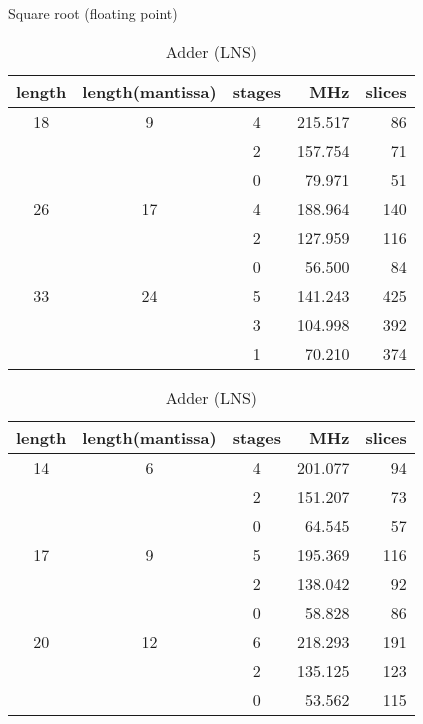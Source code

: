 \documentclass{llncs}
\begin{document}
\begin{table}
  \begin{center}
    \begin{minipage}{.45\linewidth}
      \caption{Square root (floating point)}
      \begin{center}
	\begin{tabular}{cccrr}
	  \hline
	  length  & length(mantissa) & stages & MHz & slices\\
	  \hline
	  18   &  9 & 4 & 215.517 & 86 \\
	  &    & 2 & 157.754 & 71 \\
	  &    & 0 &  79.971 & 51 \\
	  \hline
	  26   & 17 & 4 & 188.964 & 140 \\
	  &    & 2 & 127.959 & 116 \\
	  &    & 0 &  56.500 &  84 \\
	  \hline
	  33   & 24 & 5 & 141.243 & 425 \\
	  &    & 3 & 104.998 & 392 \\
	  &    & 1 &  70.210 & 374 \\
	  \hline
	\end{tabular}
      \end{center}
      \label{tabpg_float_sqrt}
    \end{minipage}
    \hspace{2.4pc}
    \begin{minipage}{.45\linewidth}
      \caption{Adder (LNS)}
      \begin{center}
	\begin{tabular}{cccrr}
	  \hline
	  length  & length(mantissa) & stages & MHz & slices\\
	  \hline
	  14   &  6 & 4 & 201.077 & 94 \\
	  &    & 2 & 151.207 & 73 \\
	  &    & 0 &  64.545 & 57 \\
	  \hline
	  17   &  9 & 5 & 195.369 & 116 \\
	  &    & 2 & 138.042 &  92 \\
	  &    & 0 &  58.828 &  86 \\
	  \hline
	  20   & 12 & 6 & 218.293 & 191 \\
	  &    & 2 & 135.125 & 123 \\
	  &    & 0 &  53.562 & 115 \\
	  \hline
	\end{tabular}
      \end{center}
      \label{tabpg_log_unsigned_add}
    \end{minipage}
  \end{center}
\end{table}
\end{document}
